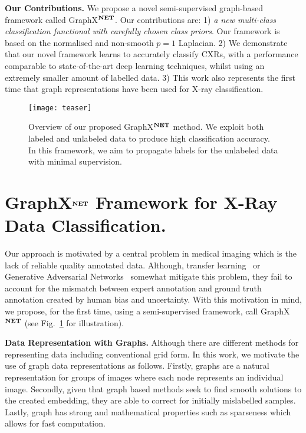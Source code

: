 \documentclass[runningheads]{llncs}
\begin{document}
\textbf{Our Contributions.} We propose a novel semi-supervised graph-based framework called GraphX$^{\textbf{\scriptsize NET}}$. Our contributions are: 1) \textit{a new multi-class classification functional with carefully chosen class priors}. Our framework is based on the normalised and non-smooth $p=1$ Laplacian.
2) We demonstrate that our novel framework learns to accurately classify CXRs, with a performance comparable to state-of-the-art deep learning techniques, whilst using an extremely smaller amount of labelled data.  3) This work also represents the first time that graph representations have been used for X-ray classification.



\begin{figure}[t!]
\centering
\texttt{[image: teaser]}
\caption{Overview of our proposed GraphX$^{\textbf{\scriptsize NET}}$ method. We exploit both labeled and unlabeled data to produce high classification accuracy. In this framework, we aim to propagate labels for the unlabeled data with minimal supervision.}
\label{fig::teaser}
\end{figure}


\section{GraphX$^{\textbf{\scriptsize NET}}$ Framework for X-Ray Data Classification.}


Our approach is motivated by a central problem in medical imaging which is the lack of reliable quality annotated data. Although, transfer learning~\cite{bar2015chest} or Generative Adversarial Networks~\cite{moradi2015machine} somewhat mitigate this problem, they fail to account for the mismatch between expert annotation and ground truth annotation created by human bias and uncertainty. With this motivation in mind, we propose, for the first time, using a semi-supervised framework, call GraphX$^{\textbf{\scriptsize NET}}$ (see  Fig.~\ref{fig::teaser} for illustration).



\textbf{Data Representation with Graphs.} Although there are different methods for representing  data including conventional grid form. In this work, we motivate the use of graph data representations as follows. Firstly, graphs are a natural representation for groups of images where each node represents an individual image. Secondly, given that graph based methods seek to find smooth solutions to the created embedding, they are able to correct for initially mislabelled samples. Lastly, graph has strong and mathematical properties such as sparseness which allows for fast computation.
\end{document}
